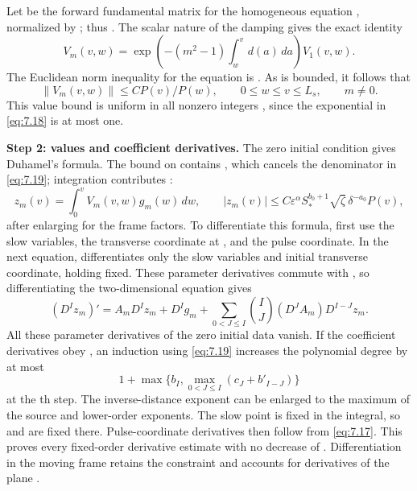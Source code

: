 %
Let  be the forward fundamental matrix for the
homogeneous equation , normalized by
; thus
. The scalar nature of
the damping gives the exact identity
\begin{equation}
  V_m(v,w)=\exp\!\left(-(m^2-1)\int_w^v d(a)\,da\right)V_1(v,w).
  \tag{7.18}\label{eq:7.18}
\end{equation}
The Euclidean norm inequality for the  equation is
.
As  is bounded, it follows that
\begin{equation}
  \lVert V_m(v,w)\rVert\leq C P(v)/P(w),
  \qquad 0\leq w\leq v\leq L_s,\qquad m\neq0.
  \tag{7.19}\label{eq:7.19}
\end{equation}
This value bound is uniform in all nonzero integers ,
since the exponential in \eqref{eq:7.18} is at most one.

\textbf{Step 2: values and coefficient derivatives.}
The zero initial condition gives Duhamel's formula. The bound on
 contains , which cancels
the denominator in \eqref{eq:7.19}; integration contributes
:
\[
  z_m(v)=\int_0^v V_m(v,w)g_m(w)\,dw,
  \qquad
  |z_m(v)|\leq C\varepsilon^\alpha S_*^{b_0+1}\sqrt{\zeta}\,\delta^{-a_0}P(v),
\]
after enlarging  for the frame factors. To
differentiate this formula, first use the slow variables, the transverse
coordinate at , and the pulse coordinate. In the next
equation,  differentiates only the slow variables and
initial transverse coordinate, holding  fixed. These
parameter derivatives commute with , so
differentiating the two-dimensional equation gives
\begin{equation}
  (D^I z_m)'=A_mD^Iz_m+D^Ig_m+
  \sum_{0<J\leq I}\binom{I}{J}(D^JA_m)D^{I-J}z_m.
  \tag{7.20}\label{eq:7.20}
\end{equation}
All these parameter derivatives of the zero initial data vanish. If the
coefficient derivatives obey
, an induction using
\eqref{eq:7.19} increases the polynomial degree by at most
\[
  1+\max\{b_I,\max_{0<J\leq I}(c_J+b'_{I-J})\}
\]
at the th step. The inverse-distance exponent can be
enlarged to the maximum of the source and lower-order exponents. The slow
point is fixed in the integral, so  and
 are fixed there. Pulse-coordinate derivatives
then follow from \eqref{eq:7.17}. This proves every fixed-order derivative
estimate with no decrease of . Differentiation in
the moving frame retains the constraint
 and accounts for derivatives of the
plane .

